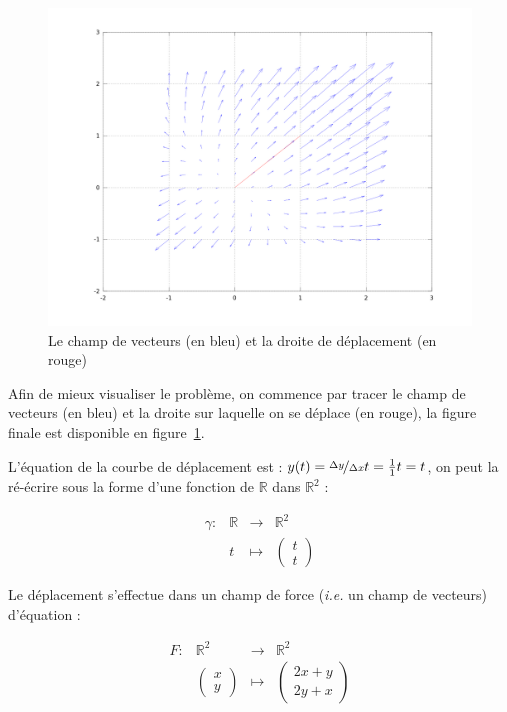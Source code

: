 \documentclass[a4paper, 11pt]{report} %
\newcommand{\R}{\mathbb{R}}
\renewcommand{\mapsto}{\longmapsto}
\begin{document}
\begin{figure}[!h]
    \includegraphics[width=15cm]{exo5.png}
    \caption{\label{fig_exo5} Le champ de vecteurs (en bleu) et la droite de déplacement (en rouge)}
\end{figure}
Afin de mieux visualiser le problème, on commence par tracer le champ de vecteurs (en bleu) et la droite sur laquelle on se
déplace (en rouge), la figure finale est disponible en figure~\ref{fig_exo5}.

L'équation de la courbe de déplacement est : $y(t) = \nicefrac{\Delta y}{\Delta x}t = \frac{1}{1}t = t$, on peut la
ré-écrire sous la forme d'une fonction de $\R$ dans $\R^2$ : 

\[
\begin{array}{llll}
    \gamma : & \R & \longrightarrow & \R^2\\
    & t & \mapsto & \begin{pmatrix}t\\t\end{pmatrix}
\end{array}
\]

Le déplacement s'effectue dans un champ de force (\textit{i.e.} un champ de vecteurs) d'équation :

\[
\begin{array}{llll}
    F : & \R^2 & \longrightarrow & \R^2\\
    & \begin{pmatrix}
        x\\
        y
      \end{pmatrix} & \mapsto &
      \begin{pmatrix}
        2x+y\\
        2y+x
      \end{pmatrix}
\end{array}
\]
\end{document}

